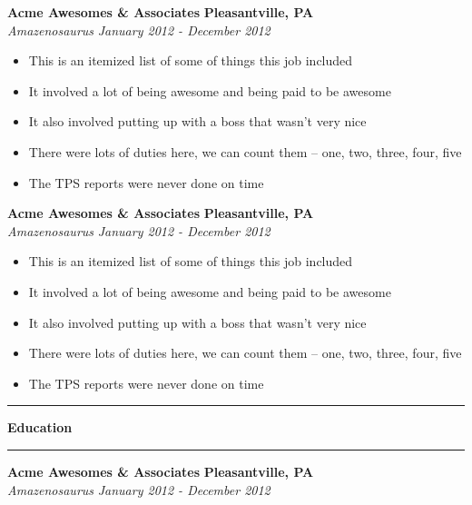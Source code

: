 \documentclass[10pt,letterpaper]{article}			%
\newcommand{
    \JobHeader}[4]{
    \textbf{Acme Awesomes \& Associates}
	\hfill
	\textbf{Pleasantville, PA}
	\\
    \emph{Amazenosaurus}
	\hfill
	\emph{January 2012 - December 2012}
	}
\newcommand{
    \sectionHeader}[1]{
    \hrule
    \vspace{0.2em}
    {\large \textbf {#1}}
    \vspace{0.2em}
    \hrule
    \vspace{0.2em}
    }
\begin{document}
	\JobHeader{Employer}{Location}{Title}{From -- To}
		\begin{itemize}
            \item This is an itemized list of some of things this job included 
		    \item It involved a lot of being awesome and being paid to be awesome
            \item It also involved putting up with a boss that wasn't very nice 
            \item There were lots of duties here, we can count them -- one, two, three, four, five
		    \item The TPS reports were never done on time
		\end{itemize}

\begin{minipage}[t]{.59\textwidth}
	\JobHeader{Employer}{Location}{Title}{From -- To}
		\begin{itemize}
            \item This is an itemized list of some of things this job included
		    \item It involved a lot of being awesome and being paid to be awesome
            \item It also involved putting up with a boss that wasn't very nice
            \item There were lots of duties here, we can count them -- one, two, three, four, five
		    \item The TPS reports were never done on time
		\end{itemize}

\sectionHeader{Education}
	\JobHeader{School}{Location}{Degree - Other Stuff}{From -- To}

\end{minipage}
\end{document}
